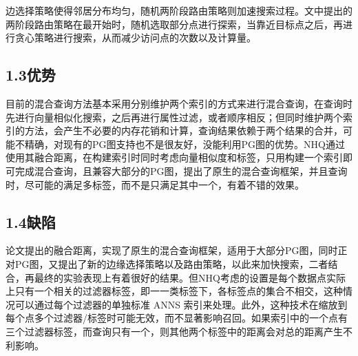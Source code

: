 \documentclass[12pt,UTF8,AutoFakeBold=2,a4paper]{ctexart} %
\newcommand{\sihao}{\fontsize{14pt}{\baselineskip}\selectfont}
\begin{document}
边选择策略使得邻居分布均匀，随机两阶段路由策略则加速搜索过程。文中提出的两阶段路由策略在最开始时，随机选取部分点进行探索，当靠近目标点之后，再进行贪心策略进行搜索，从而减少访问点的次数以及计算量。



{\subsection{1.3优势}}
目前的混合查询方法基本采用分别维护两个索引的方式来进行混合查询，在查询时先进行向量相似化搜索，之后再进行属性过滤，或者顺序相反；但同时维护两个索引的方法，会产生不必要的内存花销和计算，查询结果依赖于两个结果的合并，可能不精确，对现有的PG图支持也不是很友好，没能利用PG图的优势。NHQ通过使用其融合距离，在构建索引时同时考虑向量相似度和标签，只用构建一个索引即可完成混合查询，且兼容大部分的PG图，提出了原生的混合查询框架，并且查询时，尽可能的满足多标签，而不是只满足其中一个，有着不错的效果。


{\subsection{1.4缺陷}}
论文提出的融合距离，实现了原生的混合查询框架，适用于大部分PG图，同时正对PG图，又提出了新的边缘选择策略以及路由策略，以此来加快搜索，二者结合，再最终的实验表现上有着很好的结果。但NHQ考虑的设置是每个数据点实际上只有一个相关的过滤器标签，即一一类标签下，各标签点的集合不相交，这种情况可以通过每个过滤器的单独标准 ANNS 索引来处理。此外，这种技术在缩放到每个点多个过滤器/标签时可能无效，而不显著影响召回。如果索引中的一个点有三个过滤器标签，而查询只有一个，则其他两个标签中的距离会对总的距离产生不利影响。







\end{document}
